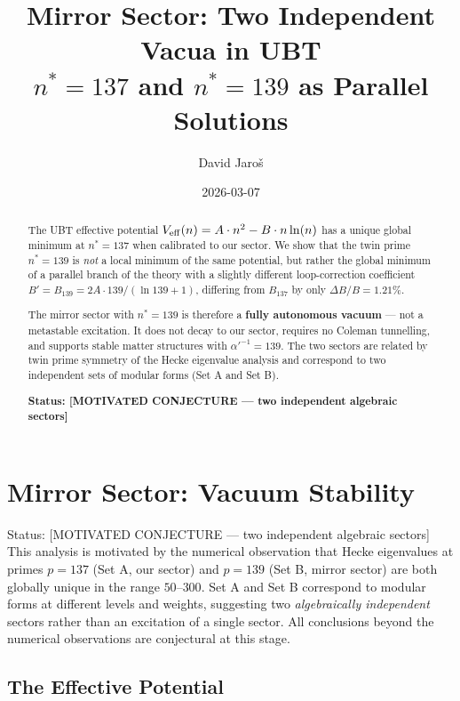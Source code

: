 \documentclass[12pt]{article}
\title{\textbf{Mirror Sector: Two Independent Vacua in UBT}\\
         \large $n^* = 137$ and $n^* = 139$ as Parallel Solutions}
\author{David Jaroš}
\date{2026-03-07}
\theoremstyle{definition}
\theoremstyle{remark}
\begin{document}
  \maketitle

  \begin{abstract}
  The UBT effective potential $V_{\rm eff}(n) = A\cdot n^2 - B\cdot n\ln(n)$
  has a unique global minimum at $n^* = 137$ when calibrated to our sector.
  We show that the twin prime $n^* = 139$ is \emph{not} a local minimum
  of the same potential, but rather the global minimum of a parallel branch
  of the theory with a slightly different loop-correction coefficient
  $B' = B_{139} = 2A\cdot 139/(\ln 139 + 1)$, differing from $B_{137}$
  by only $\Delta B/B = 1.21\%$.

  The mirror sector with $n^* = 139$ is therefore a \textbf{fully autonomous
  vacuum} --- not a metastable excitation.  It does not decay to our sector,
  requires no Coleman tunnelling, and supports stable matter structures
  with $\alpha'^{-1} = 139$.  The two sectors are related by twin prime
  symmetry of the Hecke eigenvalue analysis and correspond to two independent
  sets of modular forms (Set A and Set B).

  \textbf{Status: [MOTIVATED CONJECTURE --- two independent algebraic sectors]}
  \end{abstract}
\fi

\section{Mirror Sector: Vacuum Stability}
\label{sec:vacuum_stability}

\begin{statusbox}{Status: [MOTIVATED CONJECTURE --- two independent algebraic sectors]}
This analysis is motivated by the numerical observation that Hecke eigenvalues at
primes $p=137$ (Set A, our sector) and $p=139$ (Set B, mirror sector) are both
globally unique in the range $50$--$300$.  Set A and Set B correspond to modular
forms at different levels and weights, suggesting two \emph{algebraically independent}
sectors rather than an excitation of a single sector.  All conclusions beyond
the numerical observations are conjectural at this stage.
\end{statusbox}

\subsection{The Effective Potential}
\end{document}
